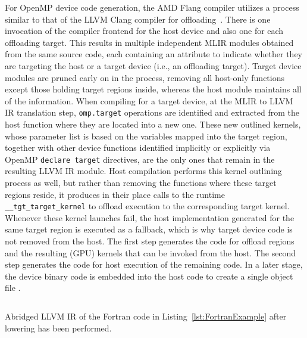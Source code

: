 \documentclass[acmtog,natbib=false]{acmart}
\newcommand{\code}[1]{\texttt{#1}\xspace}
\begin{document}
For OpenMP device code generation, the AMD Flang compiler utilizes a process similar to that of the LLVM Clang compiler for offloading~\cite{antao2016offloading}.
There is one invocation of the compiler frontend for the host device and also one for each offloading target.
This results in multiple independent \ac{MLIR} modules obtained from the same source code, each containing an attribute to indicate whether they are targeting the host or a target device (i.e., an offloading target).
Target device modules are pruned early on in the process, removing all host-only functions except those holding target regions inside, whereas the host module maintains all of the information.
When compiling for a target device, at the \ac{MLIR} to LLVM \ac{IR} translation step, \code{omp.target} operations are identified and extracted from the host function where they are located into a new one.
These new outlined kernels, whose parameter list is based on the variables mapped into the target region, together with other device functions identified implicitly or explicitly via OpenMP \code{declare target} directives, are the only ones that remain in the resulting LLVM \ac{IR} module.
Host compilation performs this kernel outlining process as well, but rather than removing the functions where these target regions reside, it produces in their place calls to the runtime \code{\_\_tgt\_target\_kernel} to offload execution to the corresponding target kernel.
Whenever these kernel launches fail, the host implementation generated for the same target region is executed as a fallback, which is why target device code is not removed from the host.
The first step generates the code for offload regions and the resulting (GPU) kernels that can be invoked from the host.
The second step generates the code for host execution of the remaining code.
In a later stage, the device binary code is embedded into the host code to create a single object file .
 

\begin{listing}[t]
\inputminted{MLIR-lexer.py:MlirLexer -x}{code/tgt_loop_abridged.ll}
\caption{Abridged LLVM \ac{IR} of the Fortran code in Listing~\ref{lst:FortranExample} after lowering has been performed.}
\label{lst:FortranExampleLLVMIR}
\end{listing}
\end{document}
